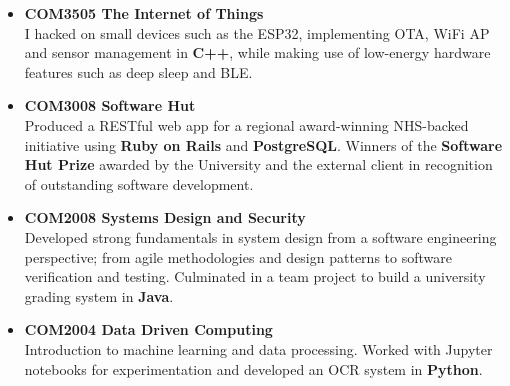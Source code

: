 \documentclass[11pt,a4paper,sans]{moderncv}
\begin{document}
{\begin{itemize}
    \item \textbf{COM3505 The Internet of Things}\\
          I hacked on small devices such as the ESP32, implementing OTA, WiFi AP and sensor management in \textbf{C++}, while making use of low-energy hardware features such as deep sleep and BLE.
    \item \textbf{COM3008 Software Hut}\\
          Produced a RESTful web app for a regional award-winning NHS-backed initiative using \textbf{Ruby on Rails} and \textbf{PostgreSQL}. Winners of the \textbf{Software Hut Prize} awarded by the University and the external client in recognition of outstanding software development.
    \item \textbf{COM2008 Systems Design and Security}\\
          Developed strong fundamentals in system design from a software engineering perspective; from agile methodologies and design patterns to software verification and testing. Culminated in a team project to build a university grading system in \textbf{Java}.
    \item \textbf{COM2004 Data Driven Computing}\\
          Introduction to machine learning and data processing. Worked with Jupyter notebooks for experimentation and developed an OCR system in \textbf{Python}.
\end{itemize}}

\vspace{1em}

\end{document}
